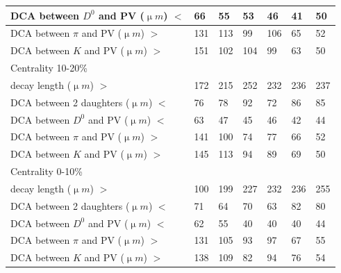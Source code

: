 \begin{table}[htp]
\begin{center}
\begin{tabular}{l|l|l|l|l|l|l}
      DCA between $D^0$ and PV (${\upmu}m$) $<$ & 66 & 55 & 53 & 46 & 41 & 50\\ \hline
      DCA between $\pi$ and PV (${\upmu}m$) $>$ & 131 & 113 & 99 & 106 & 65 & 52\\ \hline
      DCA between $K$ and PV (${\upmu}m$) $>$ & 151 & 102 & 104 & 99 & 63 & 50\\ \hline
      Centrality  10-20\% &  &  &  &  & & \\ \hline
      decay length (${\upmu}m$) $>$ & 172 & 215 & 252 & 232 & 236 & 237\\ \hline
      DCA between 2 daughters (${\upmu}m$) $<$ & 76 & 78 & 92 & 72 & 86 & 85\\ \hline
      DCA between $D^0$ and PV (${\upmu}m$) $<$ & 63 & 47 & 45 & 46 & 42 & 44\\ \hline
      DCA between $\pi$ and PV (${\upmu}m$) $>$ & 141 & 100 & 74 & 77 & 66 & 52\\ \hline
      DCA between $K$ and PV (${\upmu}m$) $>$ & 145 & 113 & 94 & 89 & 69 & 50\\ \hline
      Centrality  0-10\% &  &  &  &  & & \\ \hline
      decay length (${\upmu}m$) $>$ & 100 & 199 & 227 & 232 & 236 & 255\\ \hline
      DCA between 2 daughters (${\upmu}m$) $<$ & 71 & 64 & 70 & 63 & 82 & 80\\ \hline
      DCA between $D^0$ and PV (${\upmu}m$) $<$ & 62 & 55 & 40 & 40 & 40 & 44\\ \hline
      DCA between $\pi$ and PV (${\upmu}m$) $>$ & 131 & 105 & 93 & 97 & 67 & 55\\ \hline
      DCA between $K$ and PV (${\upmu}m$) $>$ & 138 & 109 & 82 & 94 & 76 & 54\\ \hline
    \end{tabular}
  \end{center}
\end{table}

